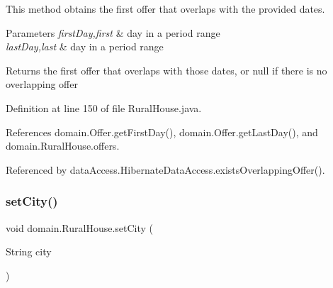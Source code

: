 This method obtains the first offer that overlaps with the provided dates. 


\begin{DoxyParams}{Parameters}
{\em first\+Day,first} & day in a period range \\
\hline
{\em last\+Day,last} & day in a period range \\
\hline
\end{DoxyParams}
\begin{DoxyReturn}{Returns}
the first offer that overlaps with those dates, or null if there is no overlapping offer 
\end{DoxyReturn}


Definition at line 150 of file Rural\+House.\+java.


\begin{DoxyCode}{0}

\end{DoxyCode}


References domain.\+Offer.\+get\+First\+Day(), domain.\+Offer.\+get\+Last\+Day(), and domain.\+Rural\+House.\+offers.



Referenced by data\+Access.\+Hibernate\+Data\+Access.\+exists\+Overlapping\+Offer().

\mbox{\label{classdomain_1_1RuralHouse_a04f87e3266ab2b0d9b42bb8f947d6172}} 
\subsubsection{\texorpdfstring{setCity()}{setCity()}}
{\footnotesize\ttfamily void domain.\+Rural\+House.\+set\+City (\begin{DoxyParamCaption}\item[{String}]{city }\end{DoxyParamCaption})}




